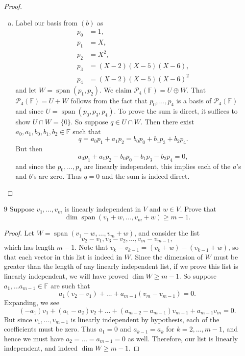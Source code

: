 \documentclass{extarticle}
\newenvironment{problem}[1]{\begin{prob*}{#1}{}}{\end{prob*}}
\newcommand{\F}{\mathbb{F}}
\DeclareMathOperator{\Span}{span}
\begin{document}
\begin{proof}
\begin{enumerate}[(a)]
\item Label our basis from $(b)$ as
\begin{align*}
p_0 &= 1, \\ p_1 &= X,\\ p_2 &= X^2,\\ p_3 &= (X - 2)(X-5)(X-6), \\ p_4 &= (X-2)(X-5)(X-6)^2
\end{align*}
and let $W = \Span(p_1, p_2)$.  We claim $\mathcal{P}_4(\F) = U\oplus W$.  That $\mathcal{P}_4(\F) = U + W$ follows from the fact that $p_0,\dots, p_4$ is a basis of $\mathcal{P}_4(\F)$ and since $U = \Span(p_0, p_3, p_4)$.  To prove the sum is direct, it suffices to show $U\cap W=\{0\}$.  So suppose $q\in U\cap W$.  Then there exist $a_0, a_1, b_0, b_1, b_2\in\F$ such that 
\begin{equation*}
q = a_0p_1 + a_1 p_2 = b_0p_0 + b_1 p_3 + b_2 p_4.
\end{equation*}
But then
\begin{equation*}
a_0p_1 + a_1 p_2 - b_0p_0 - b_1 p_3 - b_2 p_4 = 0,
\end{equation*}
and since the $p_0,\dots,p_4$ are linearly independent, this implies each of the $a$'s and $b$'s are zero.  Thus $q=0$ and the sum is indeed direct. \qedhere
\end{enumerate}
\end{proof}

\begin{problem}{9}
Suppose $v_1,\dots, v_m$ is linearly independent in $V$ and $w\in V$.  Prove that 
\begin{equation*}
\dim\Span(v_1 + w, \dots, v_m + w)\geq m - 1.
\end{equation*}
\end{problem}
\begin{proof}
Let $W = \Span(v_1 + w, \dots, v_m + w)$, and consider the list
\begin{equation*}
v_2 - v_1, v_3 - v_2,\dots, v_m - v_{m-1},
\end{equation*}
which has length $m - 1$.  Note that $v_k - v_{k - 1} = (v_k + w) - (v_{k - 1} + w)$, so that each vector in this list is indeed in $W$.  Since the dimension of $W$ must be greater than the length of any linearly independent list, if we prove this list is linearly independent, we will have proved $\dim W\geq m - 1$.  So suppose $a_1,\dots a_{m - 1}\in\F$ are such that 
\begin{equation*}
a_1(v_2 - v_1) + \dots + a_{m-1}(v_m - v_{m-1}) = 0.
\end{equation*}
Expanding, we see
\begin{equation*}
(-a_1)v_1 + (a_1 - a_2)v_2 + \dots + (a_{m-2} - a_{m-1})v_{m-1} + a_{m-1}v_m = 0.
\end{equation*}
But since $v_1,\dots,v_{m-1}$ is linearly independent by hypothesis, each of the coefficients must be zero.  Thus $a_1 = 0$ and $a_{k-1} = a_{k}$ for $k = 2, \dots, m- 1$, and hence we must have $a_2=\dots = a_{m-1}=0$ as well.  Therefore, our list is linearly independent, and indeed $\dim W \geq m-1$.
\end{proof}
\end{document}
